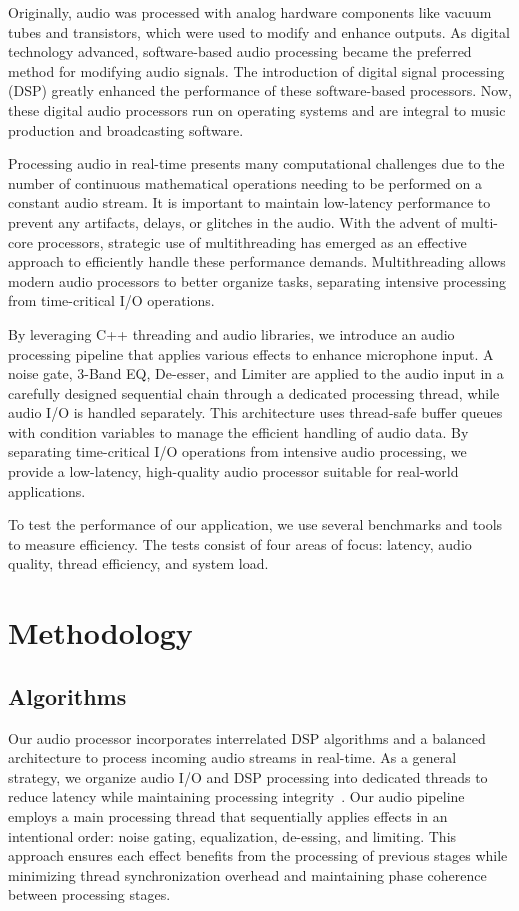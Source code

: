 \documentclass[conference]{IEEEtran}
\begin{document}
Originally, audio was processed with analog hardware components like vacuum tubes and transistors, which were used to modify and enhance outputs. As digital technology advanced, software-based audio processing became the preferred method for modifying audio signals. The introduction of digital signal processing (DSP) greatly enhanced the performance of these software-based processors. Now, these digital audio processors run on operating systems and are integral to music production and broadcasting software.

Processing audio in real-time presents many computational challenges due to the number of continuous mathematical operations needing to be performed on a constant audio stream. It is important to maintain low-latency performance to prevent any artifacts, delays, or glitches in the audio. With the advent of multi-core processors, strategic use of multithreading has emerged as an effective approach to efficiently handle these performance demands. Multithreading allows modern audio processors to better organize tasks, separating intensive processing from time-critical I/O operations.

By leveraging C++ threading and audio libraries, we introduce an audio processing pipeline that applies various effects to enhance microphone input. A noise gate, 3-Band EQ, De-esser, and Limiter are applied to the audio input in a carefully designed sequential chain through a dedicated processing thread, while audio I/O is handled separately. This architecture uses thread-safe buffer queues with condition variables to manage the efficient handling of audio data. By separating time-critical I/O operations from intensive audio processing, we provide a low-latency, high-quality audio processor suitable for real-world applications.

To test the performance of our application, we use several benchmarks and tools to measure efficiency. The tests consist of four areas of focus: latency, audio quality, thread efficiency, and system load.


\section{Methodology}

\subsection{Algorithms}
Our audio processor incorporates interrelated DSP algorithms and a balanced architecture to process incoming audio streams in real-time. As a general strategy, we organize audio I/O and DSP processing into dedicated threads to reduce latency while maintaining processing integrity~\cite{geier2012}. Our audio pipeline employs a main processing thread that sequentially applies effects in an intentional order: noise gating, equalization, de-essing, and limiting. This approach ensures each effect benefits from the processing of previous stages while minimizing thread synchronization overhead and maintaining phase coherence between processing stages.
\end{document}

